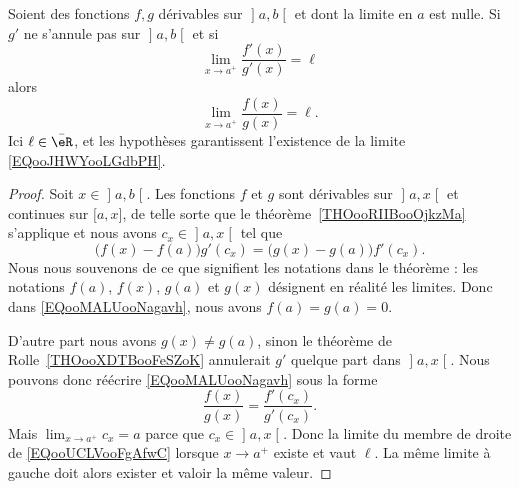 \begin{proposition}     \label{PROPooBZHTooHmyGsy}
	Soient des fonctions \( f,g\) dérivables sur \( \mathopen] a , b \mathclose[\) et dont la limite en \( a\) est nulle. Si \( g'\) ne s'annule pas sur \( \mathopen] a , b \mathclose[\) et si
	\begin{equation}
		\lim_{x\to a^+} \frac{ f'(x) }{ g'(x) }=\ell
	\end{equation}
	alors
	\begin{equation}        \label{EQooJHWYooLGdbPH}
		\lim_{x\to a^+} \frac{ f(x) }{ g(x) }=\ell.
	\end{equation}
	Ici \( \ell\in \bar \eR\), et les hypothèses garantissent l'existence de la limite \eqref{EQooJHWYooLGdbPH}.
\end{proposition}

\begin{proof}
	Soit \( x\in\mathopen] a , b \mathclose[\). Les fonctions \( f\) et \( g\) sont dérivables sur \( \mathopen] a , x \mathclose[\) et continues sur \( \mathopen[ a , x \mathclose]\), de telle sorte que le théorème~\ref{THOooRIIBooOjkzMa} s'applique et nous avons \( c_x\in \mathopen] a , x \mathclose[\) tel que
		\begin{equation}        \label{EQooMALUooNagavh}
			\big( f(x)-f(a) \big)g'(c_x)=\big( g(x)-g(a) \big)f'(c_x).
		\end{equation}
		Nous nous souvenons de ce que signifient les notations dans le théorème : les notations \( f(a)\), \( f(x)\), \( g(a)\) et \( g(x)\) désignent en réalité les limites. Donc dans \eqref{EQooMALUooNagavh}, nous avons \( f(a)=g(a)=0\).

		D'autre part nous avons \( g(x)\neq g(a)\), sinon le théorème de Rolle~\ref{THOooXDTBooFeSZoK} annulerait \( g'\) quelque part dans \( \mathopen] a , x \mathclose[\). Nous pouvons donc réécrire \eqref{EQooMALUooNagavh} sous la forme
		\begin{equation}        \label{EQooUCLVooFgAfwC}
			\frac{ f(x) }{ g(x) }=\frac{ f'(c_x) }{ g'(c_x) }.
		\end{equation}
		Mais \( \lim_{x\to a^+} c_x=a\) parce que \( c_x\in\mathopen] a , x \mathclose[\). Donc la limite du membre de droite de \eqref{EQooUCLVooFgAfwC} lorsque \( x\to a^+\) existe et vaut \( \ell\). La même limite à gauche doit alors exister et valoir la même valeur.
\end{proof}

